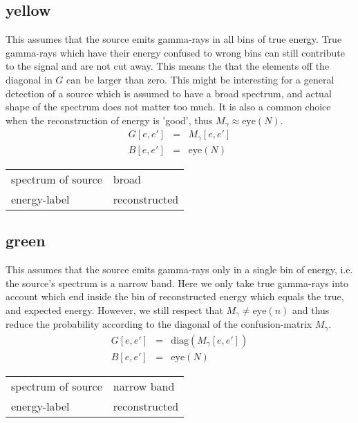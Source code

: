 \documentclass{article}%
\begin{document}
    \subsection{yellow}
    This assumes that the source emits gamma-rays in all bins of true energy.
    True gamma-rays which have their energy confused to wrong bins can still contribute to the signal and are not cut away.
    This means the that the elements off the diagonal in $G$ can be larger than zero.
    This might be interesting for a general detection of a source which is assumed to have a broad spectrum, and actual shape of the spectrum does not matter too much.
    It is also a common choice when the reconstruction of energy is 'good', thus $M_\gamma \approx \mathrm{eye}(N)$.
    \begin{eqnarray}
        G[e, e'] &=& M_{\gamma}[e, e']
        \\
        B[e, e'] &=& \mathrm{eye}(N)
    \end{eqnarray}
    \begin{center}
        \begin{tabular}{ll}
            spectrum of source & broad\\
            energy-label & reconstructed\\
        \end{tabular}
    \end{center}
    \subsection{green}
    This assumes that the source emits gamma-rays only in a single bin of energy, i.e. the source's spectrum is a narrow band.
    Here we only take true gamma-rays into account which end inside the bin of reconstructed energy which equals the true, and expected energy.
    However, we still respect that $M_{\gamma} \neq \mathrm{eye}(n)$ and thus reduce the probability according to the diagonal of the confusion-matrix $M_{\gamma}$.
    \begin{eqnarray}
        G[e, e'] &=& \mathrm{diag}(M_{\gamma}[e, e'])
        \\
        B[e, e'] &=& \mathrm{eye}(N)
    \end{eqnarray}
    \begin{center}
        \begin{tabular}{ll}
            spectrum of source & narrow band\\
            energy-label & reconstructed\\
        \end{tabular}
    \end{center}
\end{document}
